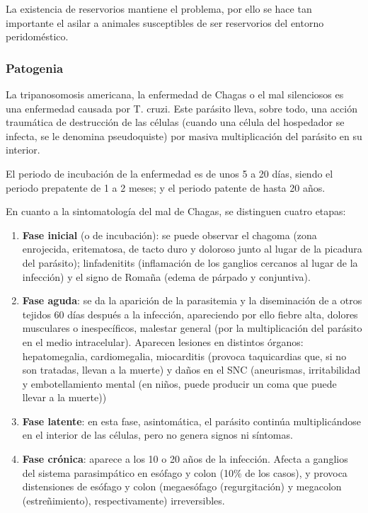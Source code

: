 La existencia de reservorios mantiene el problema, por ello se hace tan importante el asilar a animales susceptibles de ser reservorios del entorno peridoméstico.
\subsubsection{Patogenia}
La tripanosomosis americana, la enfermedad de Chagas o el mal silenciosos es una enfermedad causada por T. cruzi. Este parásito lleva, sobre todo, una acción traumática de destrucción de las células (cuando una célula del hospedador se infecta, se le denomina pseudoquiste) por masiva multiplicación del parásito en su interior.

El periodo de incubación de la enfermedad es de unos 5 a 20 días, siendo el periodo prepatente de 1 a 2 meses; y el periodo patente de hasta 20 años.

En cuanto a la sintomatología del mal de Chagas, se distinguen cuatro etapas:
\begin{enumerate}[itemsep=0pt,parsep=0pt,topsep=0pt,partopsep=0pt] 
	\item \textbf{Fase inicial} (o de incubación): se puede observar el chagoma (zona enrojecida, eritematosa, de tacto duro y doloroso junto al lugar de la picadura del parásito); linfadenitits (inflamación de los ganglios cercanos al lugar de la infección) y el signo de Romaña (edema de párpado y conjuntiva).
	\item \textbf{Fase aguda}: se da la aparición de la parasitemia y la diseminación de a otros tejidos 60 días después a la infección, apareciendo por ello fiebre alta, dolores musculares o inespecíficos, malestar general (por la multiplicación del parásito en el medio intracelular). Aparecen lesiones en distintos órganos: hepatomegalia, cardiomegalia, miocarditis (provoca taquicardias que, si no son tratadas, llevan a la muerte) y daños en el SNC (aneurismas, irritabilidad y embotellamiento mental (en niños, puede producir un coma que puede llevar a la muerte))
	\item \textbf{Fase latente}: en esta fase, asintomática, el parásito continúa multiplicándose en el interior de las células, pero no genera signos ni síntomas.
	\item \textbf{Fase crónica}: aparece a los 10 o 20 años de la infección. Afecta a ganglios del sistema parasimpático en esófago y colon (10\% de los casos), y provoca distensiones de esófago y colon (megaesófago (regurgitación) y megacolon (estreñimiento), respectivamente) irreversibles.
\end{enumerate}
